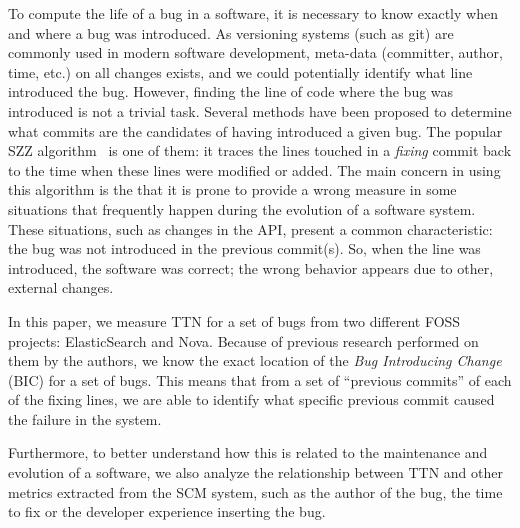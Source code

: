 \documentclass[10pt, conference]{IEEEtran}
\begin{document}
To compute the life of a bug in a software, it is necessary to know exactly when and where a bug was introduced. As versioning systems (such as git) are commonly used in modern software development, meta-data (committer, author, time, etc.) on all changes exists, and we could potentially identify what line introduced the bug. However, finding the line of code where the bug was introduced is not a trivial task. Several methods have been proposed to determine what commits are the candidates of having introduced a given bug. The popular SZZ algorithm~\cite{sliwerski2005changes} is one of them: it traces the lines touched in a \emph{fixing} commit back to the time when these lines were modified or added. The main concern in using this algorithm is the that it is prone to provide a wrong measure in some situations that frequently happen during the evolution of a software system. These situations, such as changes in the API, present a common characteristic: the bug was not introduced in the previous commit(s). So, when the line was introduced, the software was correct; the wrong behavior appears due to other, external changes.


In this paper, we measure TTN for a set of bugs from two different FOSS projects: ElasticSearch and Nova. Because of previous research performed on them by the authors, we know the exact location of the \emph{Bug Introducing Change} (BIC) for a set of bugs. This means that from a set of ``previous commits'' of each of the fixing lines, we are able to identify what specific previous commit caused the failure in the system.

Furthermore, to better understand how this is related to the maintenance and evolution of a software, we also analyze the relationship between TTN and other metrics extracted from the SCM system, such as the author of the bug, the time to fix or the developer experience inserting the bug.


\end{document}
